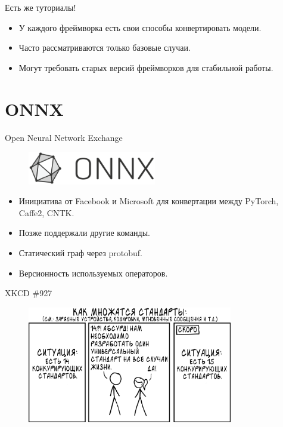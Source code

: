 \documentclass[mathserif,serif,unicode]{beamer}
\begin{document}
\begin{frame}{Есть же туториалы!}
    \begin{itemize}
        \item У каждого фреймворка есть свои способы конвертировать модели.
        \item Часто рассматриваются только базовые случаи.
        \item Могут требовать старых версий фреймворков для стабильной работы.
    \end{itemize}

\end{frame}

\section{ONNX}

\begin{frame}{Open Neural Network Exchange}
    
    \begin{figure}
        \includegraphics[width=0.5\textwidth]{images/ONNX_logo_main.png}
    \end{figure}

    \begin{itemize}
        \item Инициатива от Facebook и Microsoft для конвертации между PyTorch, Caffe2, CNTK.
        \item Позже поддержали другие команды.
        \vspace{5mm}
        \item Статический граф через protobuf.
        \item Версионность используемых операторов.
    \end{itemize}
\end{frame}

\begin{frame}{XKCD \#927}
    \begin{figure}
        \centering
        \includegraphics[width=0.8\textwidth]{images/927_v4.png}
    \end{figure}
\end{frame}
\end{document}
